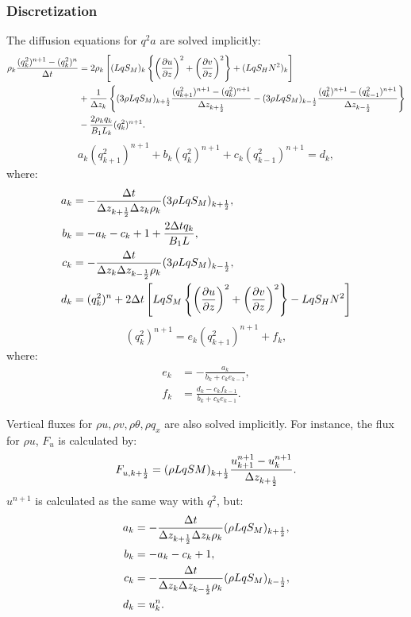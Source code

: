 \subsubsection{Discretization}
The diffusion equations for $q^2a$ are solved implicitly:
\begin{align}
  \rho_k \frac{(q^2_k)^{n+1}-(q^2_k)^n}{\Delta t}
  &= 
  2\rho_k \left[ (LqS_M)_k\left\{\left(\frac{\partial u}{\partial z}\right)^2+\left(\frac{\partial v}{\partial z}\right)^2\right\} + (LqS_HN^2)_k \right] \nonumber \\
  &+ \frac{1}{\Delta z_k}\left\{ (3\rho LqS_M)_{k+\frac{1}{2}} \frac{(q^2_{k+1})^{n+1}-(q^2_k)^{n+1}}{\Delta z_{k+\frac{1}{2}}} - (3\rho LqS_M)_{k-\frac{1}{2}} \frac{(q^2_k)^{n+1}-(q^2_{k-1})^{n+1}}{\Delta z_{k-\frac{1}{2}}} \right\} \nonumber \\
  &-\frac{2\rho_k q_k}{B_1L_k}(q^2_k)^{n+1}.
\end{align}
\begin{equation}
  a_k (q^2_{k+1})^{n+1} + b_k (q^2_k)^{n+1} + c_k (q^2_{k-1})^{n+1} = d_k,
\end{equation}
where:
\begin{align}
  a_k &= -\frac{\Delta t}{\Delta z_{k+\frac{1}{2}}\Delta z_k\rho_k}(3\rho LqS_M)_{k+\frac{1}{2}}, \\
  b_k &= -a_k - c_k + 1 + \frac{2\Delta tq_k}{B_1L}, \\
  c_k &= -\frac{\Delta t}{\Delta z_k\Delta z_{k-\frac{1}{2}}\rho_k}(3\rho LqS_M)_{k-\frac{1}{2}}, \\
  d_k &= (q^2_k)^n + 2\Delta t \left[ LqS_M\left\{\left(\frac{\partial u}{\partial z}\right)^2+\left(\frac{\partial v}{\partial z}\right)^2\right\} - LqS_HN^2 \right]
\end{align}
\begin{equation}
  (q^2_k)^{n+1} = e_k (q^2_{k+1})^{n+1} + f_k,
\end{equation}
where:
\begin{align}
  e_k &= -\frac{a_k}{b_k+c_ke_{k-1}}, \\
  f_k &= \frac{d_k-c_kf_{k-1}}{b_k+c_ke_{k-1}}.
\end{align}

Vertical fluxes for $\rho u, \rho v, \rho\theta, \rho q_x$ are also solved implicitly.
For instance, the flux for $\rho u$, $F_u$ is calculated by:
\begin{equation}
  F_{u,k+\frac{1}{2}} = (\rho LqSM)_{k+\frac{1}{2}}\frac{u^{n+1}_{k+1}-u^{n+1}_k}{\Delta z_{k+\frac{1}{2}}}.
\end{equation}
$u^{n+1}$ is calculated as the same way with $q^2$, but:
\begin{align}
  a_k &= -\frac{\Delta t}{\Delta z_{k+\frac{1}{2}}\Delta z_k\rho_k}(\rho LqS_M)_{k+\frac{1}{2}}, \\
  b_k &= -a_k - c_k + 1, \\
  c_k &= -\frac{\Delta t}{\Delta z_k\Delta z_{k-\frac{1}{2}}\rho_k}(\rho LqS_M)_{k-\frac{1}{2}}, \\
  d_k &= u_k^n.
\end{align}

%

